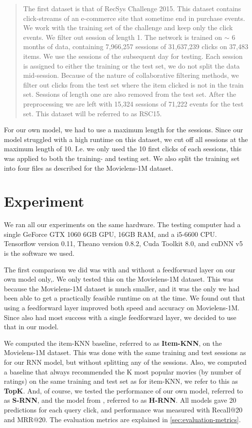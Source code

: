 \begin{quotation}
	The first dataset is that of RecSys Challenge 2015. This dataset contains click-streams of an e-commerce site that sometime end in purchase events. We work with the training set of the challenge and keep only the click events. We filter out session of length 1. The network is trained on $\sim$ 6 months of data, containing 7,966,257 sessions of 31,637,239 clicks on 37,483 items. We use the sessions of the subsequent day for testing. Each session is assigned to either the training or the test set, we do not split the data mid-session. Because of the nature of collaborative filtering methods, we filter out clicks from the test set where the item clicked is not in the train set. Sessions of length one are also removed from the test set. After the preprocessing we are left with 15,324 sessions of 71,222 events for the test set. This dataset will be referred to as RSC15.
\end{quotation}

For our own model, we had to use a maximum length for the sessions. Since our model struggled with a high runtime on this dataset, we cut off all sessions at the maximum length of 10. I.e. we only used the 10 first clicks of each sessions, this was applied to both the training- and testing set. We also split the training set into four files as described for the Movielens-1M dataset. 

\section{Experiment}
We ran all our experiments on the same hardware. The testing computer had a single GeForce GTX 1060 6GB GPU, 16GB RAM, and a i5-6600 CPU. Tensorflow version 0.11, Theano version 0.8.2, Cuda Toolkit 8.0, and cuDNN v5 is the software we used. 

The first comparison we did was with and without a feedforward layer on our own model only,. We only tested this on the Movielens-1M dataset. This was because the Movielens-1M dataset is much smaller, and it was the only we had been able to get a practically feasible runtime on at the time. We found out that using a feedforward layer improved both speed and accuracy on Movielens-1M. Since \cite{DBLP:journals/corr/HidasiKBT15} also had most success with a single feedforward layer, we decided to use that in our model. 

We computed the item-KNN baseline, referred to as \textbf{Item-KNN}, on the Movielens-1M dataset. This was done with the same training and test sessions as for our RNN model, but without splitting any of the sessions. Also, we computed a baseline that always recommended the K most popular movies (by number of ratings) on the same training and test set as for item-KNN, we refer to this as \textbf{TopK}. And, of course, we tested the performance of our own model, referred to as \textbf{S-RNN}, and the model from \cite{DBLP:journals/corr/HidasiKBT15}, referred to as \textbf{H-RNN}. All models gave 20 predictions for each query click, and performance was measured with Recall@20 and MRR@20. The evaluation metrics are explained in \ref{sec:evaluation-metrics}.

